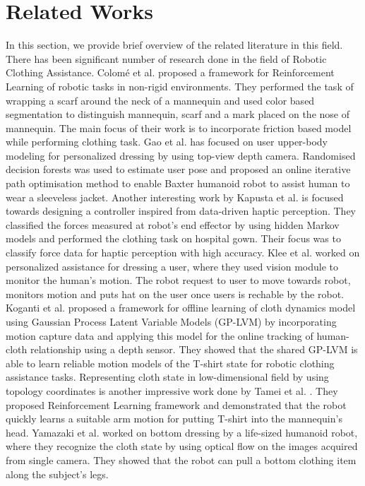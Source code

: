 \documentclass[sigconf]{acmart}
\begin{document}
\section{Related Works}
\label{sec:related_works}
In this section, we provide brief overview of the related literature in this field. There has been significant number of research done in the field of Robotic Clothing Assistance. Colom{\'e} et al. \cite{colome2015friction} proposed a framework for Reinforcement Learning of robotic tasks in non-rigid environments. They performed the task of wrapping a scarf around the neck of a mannequin and used color based segmentation to distinguish mannequin, scarf and a mark placed on the nose of mannequin. The main focus of their work is to incorporate friction based model while performing clothing task. Gao et al. \cite{gao2015user, gao2016iterative} has focused on user upper-body modeling for personalized dressing by using top-view depth camera. Randomised decision forests was used to estimate user pose and proposed an online iterative path optimisation method to enable Baxter humanoid robot to assist human to wear a sleeveless jacket. Another interesting work by Kapusta et al. \cite{kapusta2016data} is focused towards designing a controller inspired from data-driven haptic perception. They classified the forces measured at robot's end effector by using hidden Markov models and performed the clothing task on hospital gown. Their focus was to classify force data for haptic perception with high accuracy. Klee et al. \cite{klee2015personalized} worked on personalized assistance for dressing a user, where they used vision module to monitor the human's motion. The robot request to user to move towards robot, monitors motion and puts hat on the user once users is rechable by the robot. Koganti et al. \cite{koganti2015cloth} proposed a framework for offline learning of cloth dynamics model using Gaussian Process Latent Variable Models (GP-LVM) by incorporating motion capture data and applying this model for the online tracking of human-cloth relationship using a depth sensor. They showed that the shared GP-LVM is able to learn reliable motion models of the T-shirt state for robotic clothing assistance tasks. Representing cloth state in low-dimensional field by using topology coordinates is another impressive work done by Tamei et al. \cite{tamei2011reinforcement}. They proposed Reinforcement Learning framework and demonstrated that the robot quickly learns a suitable arm motion for putting T-shirt into the mannequin's head. Yamazaki et al. \cite{yamazaki2013method, yamazaki2014bottom}  worked on bottom dressing by a life-sized humanoid robot, where they recognize the cloth state by using  optical flow on the images acquired from single camera. They showed that the robot can pull a bottom clothing item along the subject's legs.
\end{document}
